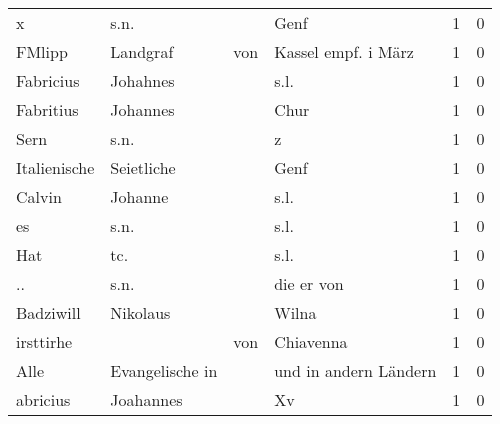 \begin{tabular}{llllrr}
                        x &                               s.n. &             &                                        Genf &          1 &         0 \\
                   FMlipp &                           Landgraf &         von &                         Kassel empf. i März &          1 &         0 \\
                Fabricius &                           Johahnes &             &                                        s.l. &          1 &         0 \\
                Fabritius &                           Johannes &             &                                        Chur &          1 &         0 \\
                     Sern &                               s.n. &             &                                           z &          1 &         0 \\
             Italienische &                         Seietliche &             &                                        Genf &          1 &         0 \\
                   Calvin &                            Johanne &             &                                        s.l. &          1 &         0 \\
                       es &                               s.n. &             &                                        s.l. &          1 &         0 \\
                      Hat &                                tc. &             &                                        s.l. &          1 &         0 \\
                       .. &                               s.n. &             &                                  die er von &          1 &         0 \\
                Badziwill &                           Nikolaus &             &                                       Wilna &          1 &         0 \\
                irsttirhe &                                    &         von &                                   Chiavenna &          1 &         0 \\
                     Alle &                    Evangelische in &             &                       und in andern Ländern &          1 &         0 \\
                 abricius &                          Joahannes &             &                                          Xv &          1 &         0 \\

\end{tabular}
